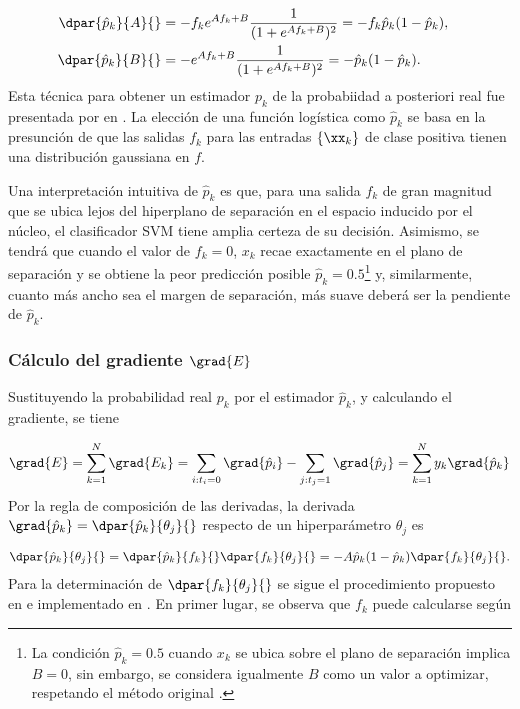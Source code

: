 \begin{align*}
  \dpar{\hat{p}_k}{A}{}&=-f_k e^{Af_k+B}\frac{1}{(1+e^{Af_k+B})^2}
  =-f_k\hat{p}_k(1-\hat{p}_k),&\\
  \dpar{\hat{p}_k}{B}{}&=    -e^{Af_k+B}\frac{1}{(1+e^{Af_k+B})^2}
  =-   \hat{p}_k(1-\hat{p}_k).
\end{align*}
Esta técnica para obtener un estimador $p_k$ de la probabiidad a
posteriori real fue presentada por \citeauthor{platt} en \cite{platt}.
La elección de una función logística como $\hat{p}_k$ se basa en la
presunción de que las salidas $f_k$ para las entradas $\{\xx_k\}$ de
clase positiva tienen una distribución gaussiana en $f$.

Una interpretación intuitiva de $\hat{p}_k$ es que, para una salida
$f_k$ de gran magnitud que se ubica lejos del hiperplano de separación
en el espacio inducido por el núcleo, el clasificador SVM tiene amplia
certeza de su decisión.  Asimismo, se tendrá que cuando el valor de
$f_k=0$, $x_k$ recae exactamente en el plano de separación y se
obtiene la peor predicción posible $\hat{p}_k=0.5$\footnote{La
  condición $\hat{p}_k=0.5$ cuando $x_k$ se ubica sobre el plano de
  separación implica $B=0$, sin embargo, se considera igualmente $B$
  como un valor a optimizar, respetando el método original
  \cite{platt}.} y, similarmente, cuanto más ancho sea el margen de
separación, más suave deberá ser la pendiente de $\hat{p}_k$.

\subsubsection{Cálculo del gradiente $\grad{E}$}
Sustituyendo la probabilidad real $p_k$ por el estimador
$\hat{p}_k$, y calculando el gradiente, se tiene

\begin{align}
\label{gradE}
  \grad{E} = \sum_{k=1}^{N} \grad{E_k} =
  \sum_{ i:t_i=0  } \grad{\hat{p}_i}
  - \sum_{ j:t_j=1  } \grad{\hat{p}_j}
  = \sum_{k=1}^{N} y_k \grad{\hat{p}_k}
\end{align}
Por la regla de composición de las derivadas, la derivada
$\grad{\hat{p}_k}=\dpar{\hat{p}_k}{\theta_j}{}$ respecto de un
hiperparámetro ${\theta_j}$ es

\begin{align}
  \dpar{\hat{p}_k}{\theta_j}{} =
  \dpar{\hat{p}_k}{f_k}{}\dpar{f_k}{\theta_j}{} =
  -A\hat{p}_k(1-\hat{p}_k)\dpar{f_k}{\theta_j}{}.
  \label{eq:deriv-pk-thetak}
\end{align}
Para la determinación de $\dpar{f_k}{\theta_j}{}$ se sigue el
procedimiento propuesto en \cite{keerthi, glasmachers} e implementado
en \cite{shark}.
En primer lugar, se observa que $f_k$ puede calcularse según

